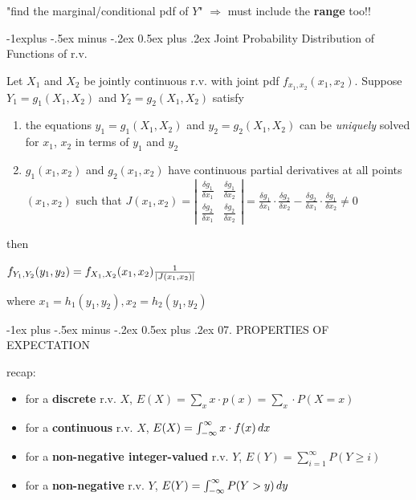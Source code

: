 \documentclass[10pt, landscape]{article}
\makeatletter
\renewcommand{\section}{\@startsection{section}{1}{0mm}%
  {-1ex plus -.5ex minus -.2ex}%
  {0.5ex plus .2ex}%
{\normalfont\large\bfseries}}
\renewcommand{\subsection}{\@startsection{subsection}{2}{0mm}%
  {-1explus -.5ex minus -.2ex}%
  {0.5ex plus .2ex}%
{\normalfont\normalsize\bfseries}}
\makeatother
\begin{document}
\begin{multicols*}{3}
  \attention "find the marginal/conditional pdf of $Y$" $\Rightarrow$ must include the \textbf{range} too!! 


  \subsection{Joint Probability Distribution of Functions of r.v.}

  Let $X_1$ and $X_2$ be jointly continuous r.v. with joint pdf $f_{x_1, x_2} (x_1, x_2)$. 
  Suppose $Y_1 = g_1 (X_1, X_2)$ and $Y_2 = g_2 (X_1, X_2)$ satisfy

  \begin{enumerate}
    \item the equations $y_1 = g_1 (X_1, X_2)$ and $y_2 = g_2 (X_1, X_2)$ can be \textit{uniquely} solved for $x_1$, $x_2$ in terms of $y_1$ and $y_2$
    \item $g_1(x_1, x_2)$ and $g_2(x_1, x_2)$ have continuous partial derivatives at all points $(x_1, x_2)$ 
      such that $J(x_1, x_2) = \left\vert \begin{smallmatrix} \frac{\delta g_1}{\delta x_1} & \frac{\delta g_1}{\delta x_2}
      \\ \frac{\delta g_2}{\delta x_1} & \frac{\delta g_2}{\delta x_2} \end{smallmatrix} \right\vert = \frac{\delta g_1}{\delta x_1} \cdot \frac{\delta g_2}{\delta x_2} - \frac{\delta g_2}{\delta x_1} \cdot \frac{\delta g_1}{\delta x_2} \neq 0 $
    \end{enumerate}

    then 
    \begin{tightcenter}
      $f_{Y_1, Y_2} (y_1, y_2) = f_{X_1, X_2} (x_1, x_2) \frac{1}{\vert J(x_1, x_2) \vert} $

      where $x_1 = h_1(y_1, y_2), x_2 = h_2(y_1, y_2)$
    \end{tightcenter}


    \section{07. PROPERTIES OF EXPECTATION}

    recap:

    \begin{itemize}
      \item for a \textbf{discrete} r.v. $X$, $E(X) = \sum_x x \cdot p(x) = \sum_x \cdot P(X = x)$
      \item for a \textbf{continuous} r.v. $X$, $E(X) = \int^\infty_{-\infty} x \cdot f(x) \mathop{dx}$
      \item for a \textbf{non-negative integer-valued} r.v. $Y$, $E(Y) = \sum^\infty_{i=1} P(Y \geq i)$
      \item for a \textbf{non-negative} r.v. $Y$, $E(Y) = \int^\infty_{-\infty} P(Y > y)\mathop{dy}$
    \end{itemize}


\end{multicols*}
\end{document}

